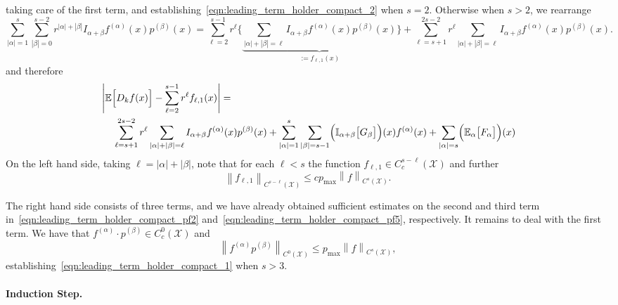 \documentclass{article}
\newcommand{\abs}[1]{\left \lvert #1 \right \rvert}
\newcommand{\norm}[1]{\left \lVert #1 \right \rVert}
\newcommand{\1}{\mathbf{1}}
\newcommand{\Xset}{\mathcal{X}}
\newcommand{\Ebb}{\mathbb{E}}
\newcommand{\Ibb}{\mathbb{I}}
\theoremstyle{alden}
\theoremstyle{aldenthm}
\theoremstyle{definition}
\theoremstyle{remark}
\begin{document}
taking care of the first term, and establishing~\eqref{eqn:leading_term_holder_compact_2} when $s = 2$. Otherwise when $s > 2$, we rearrange
\begin{equation*}
\sum_{\abs{\alpha} = 1}^{s} \sum_{\abs{\beta} = 0}^{s - 2} r^{\abs{\alpha} + \abs{\beta}} I_{\alpha + \beta} f^{(\alpha)}(x) p^{(\beta)}(x) = \sum_{\ell = 2}^{s - 1} r^{\ell} \Biggl\{\underbrace{\sum_{\abs{\alpha} + \abs{\beta} = \ell} I_{\alpha + \beta} f^{(\alpha)}(x) p^{(\beta)}(x)}_{:=f_{\ell,1}(x)}\Biggr\} + \sum_{\ell = s + 1}^{2s - 2} r^{\ell} \sum_{\abs{\alpha} + \abs{\beta} = \ell} I_{\alpha + \beta} f^{(\alpha)}(x) p^{(\beta)}(x).
\end{equation*}
and therefore
\begin{align*}
& \abs{\Ebb\Bigl[D_kf(x)\Bigr] - \sum_{\ell = 2}^{s - 1} r^{\ell} f_{\ell,1}(x)} = \\ & ~~~~ \sum_{\ell = s + 1}^{2s - 2} r^{\ell} \sum_{\abs{\alpha} + \abs{\beta} = \ell} I_{\alpha + \beta} f^{(\alpha)}(x) p^{(\beta)}(x) +  \sum_{\abs{\alpha} = 1}^{s} \sum_{\abs{\beta} = s - 1} \Bigl(\Ibb_{\alpha + \beta}\bigl[G_{\beta}\bigr]\Bigr)(x) f^{(\alpha)}(x) + \sum_{\abs{\alpha} = s} \Bigl(\Ebb_{\alpha}\bigl[F_{\alpha}\bigr]\Bigr)(x)
\end{align*}
On the left hand side, taking $\ell = \abs{\alpha} + \abs{\beta}$, note that for each $\ell < s$ the function $f_{\ell,1} \in C_c^{s - \ell}(\Xset)$ and further
\begin{equation}
\label{eqn:leading_term_holder_compact_pf3}
\norm{f_{\ell,1}}_{C^{s - \ell}(\Xset)} \leq c p_{\max} \norm{f}_{C^s(\Xset)}.
\end{equation}

The right hand side consists of three terms, and we have already obtained sufficient estimates on the second and third term in~\eqref{eqn:leading_term_holder_compact_pf2} and~\eqref{eqn:leading_term_holder_compact_pf5}, respectively. It remains to deal with the first term. We have that $f^{(\alpha)}\cdot p^{(\beta)} \in C_c^{0}(\Xset)$ and
\begin{equation}
\label{eqn:leading_term_holder_compact_pf4}
\norm{f^{(\alpha)}p^{(\beta)}}_{C^{0}(\Xset)} \leq p_{\max} \norm{f}_{C^s(\Xset)},
\end{equation}
establishing~\eqref{eqn:leading_term_holder_compact_1} when $s > 3$.

\paragraph{Induction Step.}
\end{document}

